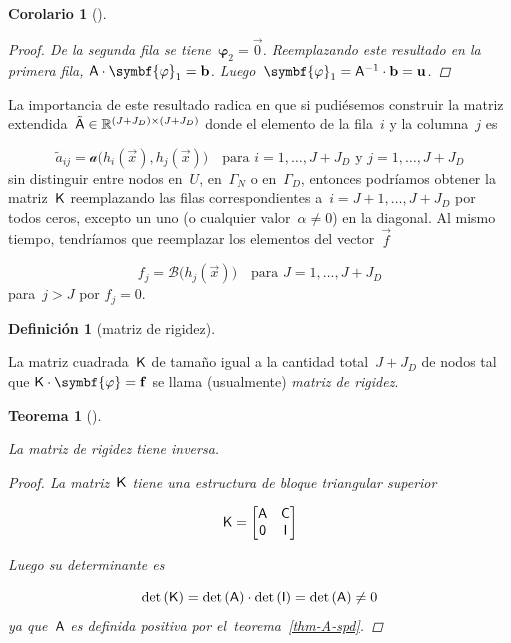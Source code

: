 \documentclass[
  12pt,
  a4paper,
  table]{scrbook}
\theoremstyle{plain}
\theoremstyle{definition}
\newtheorem{definition}{Definición}[chapter]
\theoremstyle{plain}
\newtheorem{theorem}{Teorema}[chapter]
\theoremstyle{plain}
\newtheorem{corollary}{Corolario}[chapter]
\theoremstyle{remark}
\begin{document}
\begin{corollary}[]
\begin{proof}
De la segunda fila se tiene~\(\symbf{\varphi}_2 = \vec{0}\).
Reemplazando este resultado en la primera fila,
\(\mat{A} \cdot \symbf{\varphi}_1 = \vec{b}\).
Luego~\(\symbf{\varphi}_1 = \mat{A}^{-1} \cdot \vec{b} = \vec{u}\).

\end{proof}

\end{corollary}

La importancia de este resultado radica en que si pudiésemos construir
la matriz
extendida~\(\tilde{\mathsf{A}} \in \mathbb{R}^{(J+J_D)\times(J+J_D)}\)
donde el elemento de la fila~\(i\) y la columna~\(j\) es

\[
\tilde{a}_{ij} = \mathcal{a}\Big(h_i(\vec{x}), h_j(\vec{x})\Big)
\quad \text{para $i=1,\dots,J+J_D$ y $j=1,\dots,J+J_D$}
\] sin distinguir entre nodos en~\(U\), en~\(\Gamma_N\) o
en~\(\Gamma_D\), entonces podríamos obtener la matriz~\(\mathsf{K}\)
reemplazando las filas correspondientes a~\(i=J+1,\dots,J+J_D\) por
todos ceros, excepto un uno (o cualquier valor~\(\alpha \neq 0\)) en la
diagonal. Al mismo tiempo, tendríamos que reemplazar los elementos del
vector~\(\vec{f}\)

\[
f_j = \mathcal{B}\Big(h_j(\vec{x})\Big)
\quad \text{para $J=1,\dots,J+J_D$}
\] para~\(j > J\) por \(f_j=0\).

\begin{definition}[matriz de
rigidez]\protect\hypertarget{def-rigidez}{}\label{def-rigidez}

La matriz cuadrada~\(\mathsf{K}\) de tamaño igual a la cantidad
total~\(J+J_D\) de nodos tal que
\(\mat{K} \cdot \symbf{\varphi} = \vec{f}\) se llama (usualmente)
\emph{matriz de rigidez}.

\end{definition}

\begin{theorem}[]\protect\hypertarget{thm-K-no-singular}{}\label{thm-K-no-singular}

La matriz de rigidez tiene inversa.

\begin{proof}

La matriz~\(\mathsf{K}\) tiene una estructura de bloque triangular superior

\[
\mathsf{K} =
\begin{bmatrix}
\mathsf{A} & \mathsf{C} \\
\mathsf{0} & \mathsf{I} \\
\end{bmatrix}
\]

Luego su determinante es

\[
\det{(\mathsf{K})} = \det{(\mathsf{A})} \cdot \det{(\mathsf{I})} = \det{(\mathsf{A})} \neq 0
\] ya que~\(\mathsf{A}\) es definida positiva por
el~teorema~\ref{thm-A-spd}.

\end{proof}

\end{theorem}
\end{document}
